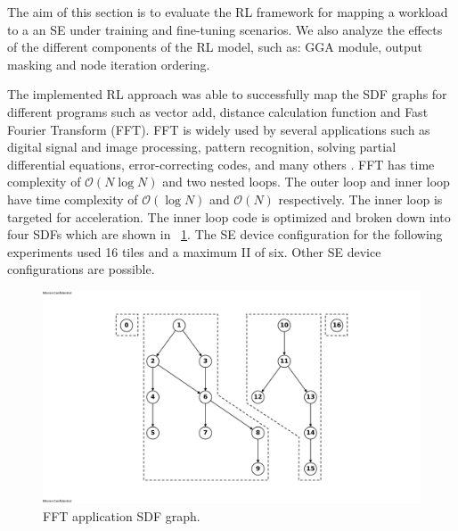
The aim of this section is to evaluate the RL framework for mapping a workload to a an SE under training and fine-tuning scenarios. 
We also analyze the effects of the different components of the RL model, such as: GGA module, output masking and node iteration ordering.

The implemented RL approach was able to successfully map the SDF graphs for different programs such as vector add, distance calculation function and Fast Fourier Transform (FFT). 
FFT is widely used by several applications such as digital signal and image processing, pattern recognition, solving partial differential equations, error-correcting codes, and many others \cite{814659}.
FFT has time complexity of $\mathcal{O}(N\log{N})$ and two nested loops.
The outer loop and inner loop have time complexity of $\mathcal{O}(\log{N})$ and $\mathcal{O}(N)$ respectively.
The inner loop is targeted for acceleration.
The inner loop code is optimized and broken down into four SDFs which are shown in \figurename~\ref{fig:ifft_graph}.
The SE device configuration for the following experiments used 16 tiles and a maximum II of six.
Other SE device configurations are possible.

\begin{figure}[tb]
  \centering
  \includegraphics[width=\linewidth]{fig/ifft_graph.pdf}
  \caption{FFT application SDF graph.}
  \label{fig:ifft_graph}
\end{figure}


